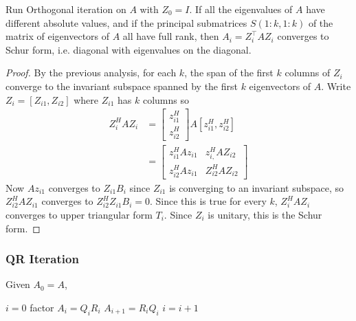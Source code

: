 \documentclass[11pt]{article}
\numberwithin{equation}{section}
\begin{document}
\begin{theorem}
    Run Orthogonal iteration on $A$ with $Z_0 = I$. If all the eigenvalues of $A$ have different absolute values, and if the principal submatrices 
    $S(1:k,1:k)$ of the matrix of eigenvectors of $A$ all have full rank, then $A_i = Z_i^\top AZ_i$ converges to Schur form, i.e. diagonal with eigenvalues on the diagonal.
    \begin{proof}
        By the previous analysis, for each $k$, the span of the first $k$ columns of $Z_i$ converge to the invariant subspace spanned by the first $k$ eigenvectors of $A$.
        Write $Z_i = [ Z_{i1} , Z_{i2} ]$ where $Z_{i1}$ has $k$ columns so \begin{align*}
            Z_i^H AZ_i &= \left[\begin{array}{l}
                z_{i1}^{H} \\
                z_{i2}^{H}
                \end{array}\right] A \left[
                    z_{i1}^{H},
                    z_{i2}^{H}\right] \\
            &= \left[\begin{array}{ll}
                z_{i 1}^{H} A z_{i{1}} & z_{i,}^{H} A Z_{i{2}} \\
                z_{i 2}^{H} A z_{i1} & Z_{i 2}^{H} A Z_{i{2}}
                \end{array}\right]
        \end{align*}
        Now $A z_{i{1}}$ converges to $Z_{i1} B_i$ since $Z_{i1}$ is converging to an invariant subspace, 
        so $Z_{i2}^H  A Z_{i1}$ converges to $Z_{i2}^H Z_{i1} B_i = 0$. 
        Since this is true for every $k$, $Z_i^H AZ_i$ converges to upper triangular form $T_i$. Since $Z_i$ is unitary, this is the Schur form.
    \end{proof}
\end{theorem}

\subsubsection{QR Iteration}
Given $A_0=A$,
\begin{algorithmfrm}[QR Iteration]
    \begin{algorithmic}[1]
        \State $i = 0$
        \State factor $A_i = Q_i R_i$
        \State $A_{i+1} = R_i Q_i$
        \State $i = i + 1$
        \EndWhile
    \end{algorithmic}
\end{algorithmfrm}
\end{document}
